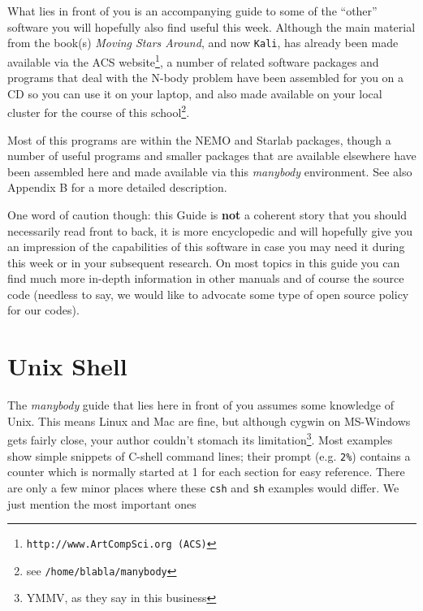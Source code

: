 What lies in front of you is an accompanying guide to some of 
the ``other'' software you will hopefully also find useful this week.
Although
the main material from the book(s) {\it Moving Stars Around}, and now
{\tt Kali},
has already been made available via the ACS
website\footnote{\tt http://www.ArtCompSci.org (ACS)},
a number of related
software packages and programs that deal with the N-body problem have been
assembled for you on a CD so you can use it on your laptop,
and also made available on your local 
cluster for the course of 
this school\footnote{see {\tt /home/blabla/manybody}}.

Most of this programs are within the NEMO  and Starlab packages, 
though a number of useful programs and smaller packages
that are available elsewhere have been assembled here
and made available via this {\it manybody} environment.
See also Appendix B for a more detailed description.

One word of caution though: this Guide is {\bf not} a coherent
story that you should necessarily read front to back, it is more encyclopedic
and will hopefully give you an impression of the capabilities
of this software in case you may need it during this week or in
your subsequent research. On most topics in this guide you can find
much more in-depth information in other manuals and of course 
the source code (needless to say, we would like to advocate some
type of open source policy for our codes).

%

\section*{Unix Shell}

The {\it manybody} guide that lies here in front of you assumes some knowledge
of Unix. This means Linux and Mac are fine, but although cygwin on MS-Windows
gets fairly close, your author couldn't 
stomach its limitation\footnote{YMMV, as they say in this business}.
Most examples show simple snippets
of C-shell command lines; their prompt (e.g. \verb+2%+) 
contains a counter which is normally started at 1 for each section
for easy reference.
There are only a few minor places where these {\tt csh} and 
{\tt sh} examples would differ. We just mention the most important ones

